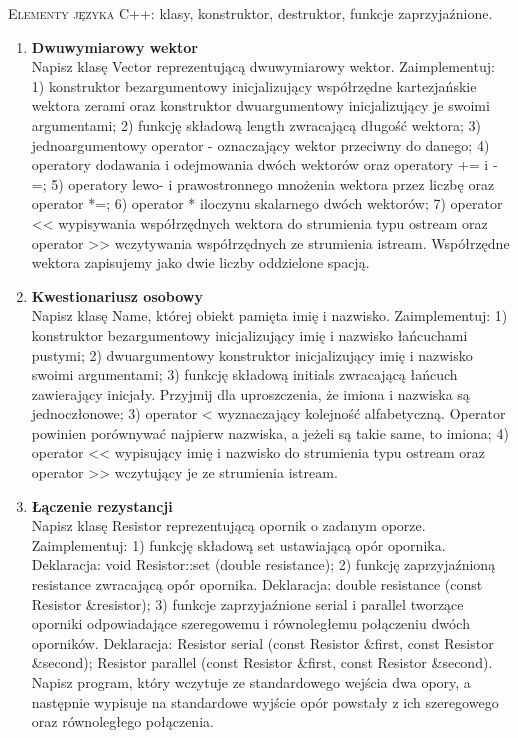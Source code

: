 \documentclass[12pt]{article}
\begin{document}
\small \textsc{Elementy języka C++:} klasy, konstruktor, destruktor, funkcje zaprzyjaźnione.

\begin{enumerate}

\item \textbf{Dwuwymiarowy wektor}\\
Napisz klasę \textsf{Vector} reprezentującą dwuwymiarowy wektor. Zaimplementuj: 1) konstruktor bezargumentowy inicjalizujący współrzędne kartezjańskie wektora zerami oraz konstruktor dwuargumentowy inicjalizujący je swoimi argumentami; 2) funkcję składową \textsf{length} zwracającą długość wektora; 3) jednoargumentowy operator \textsf{-} oznaczający wektor przeciwny do danego; 4) operatory dodawania i odejmowania dwóch wektorów oraz operatory \textsf{+=} i \textsf{-=}; 5) operatory lewo- i prawostronnego mnożenia wektora przez liczbę oraz operator \textsf{*=}; 6) operator \textsf{*} iloczynu skalarnego dwóch wektorów; 7) operator \textsf{<<} wypisywania współrzędnych wektora do strumienia typu \textsf{ostream} oraz operator \textsf{>>} wczytywania współrzędnych ze strumienia \textsf{istream}. Współrzędne wektora zapisujemy jako dwie liczby oddzielone spacją.

\item \textbf{Kwestionariusz osobowy}\\
Napisz klasę \textsf{Name}, której obiekt pamięta imię i nazwisko. Zaimplementuj: 1) konstruktor bezargumentowy inicjalizujący imię i nazwisko łańcuchami pustymi; 2) dwuargumentowy konstruktor inicjalizujący imię i nazwisko swoimi argumentami; 3) funkcję składową \textsf{initials} zwracającą łańcuch zawierający inicjały. Przyjmij dla uproszczenia, że imiona i nazwiska są jednoczłonowe; 3) operator \textsf{<} wyznaczający kolejność alfabetyczną. Operator powinien porównywać najpierw nazwiska, a jeżeli są takie same, to imiona; 4) operator \textsf{<<} wypisujący imię i nazwisko do strumienia typu \textsf{ostream} oraz operator \textsf{>>} wczytujący je ze strumienia \textsf{istream}.

\item \textbf{Łączenie rezystancji}\\
Napisz klasę \textsf{Resistor} reprezentującą opornik o zadanym oporze. Zaimplementuj: 1) funkcję składową \textsf{set} ustawiającą opór opornika. Deklaracja: \textsf{void Resistor::set (double resistance)}; 2) funkcję zaprzyjaźnioną \textsf{resistance} zwracającą opór opornika. Deklaracja: \textsf{double resistance (const Resistor \&resistor)}; 3) funkcje zaprzyjaźnione \textsf{serial} i \textsf{parallel} tworzące oporniki odpowiadające szeregowemu i równoległemu połączeniu dwóch oporników. Deklaracja: \textsf{Resistor serial (const Resistor \&first, const Resistor \&second); Resistor parallel (const Resistor \&first, const Resistor \&second)}. Napisz program, który wczytuje ze standardowego wejścia dwa opory, a następnie wypisuje na standardowe wyjście opór powstały z ich szeregowego oraz równoległego połączenia.


\end{enumerate}
\end{document}
